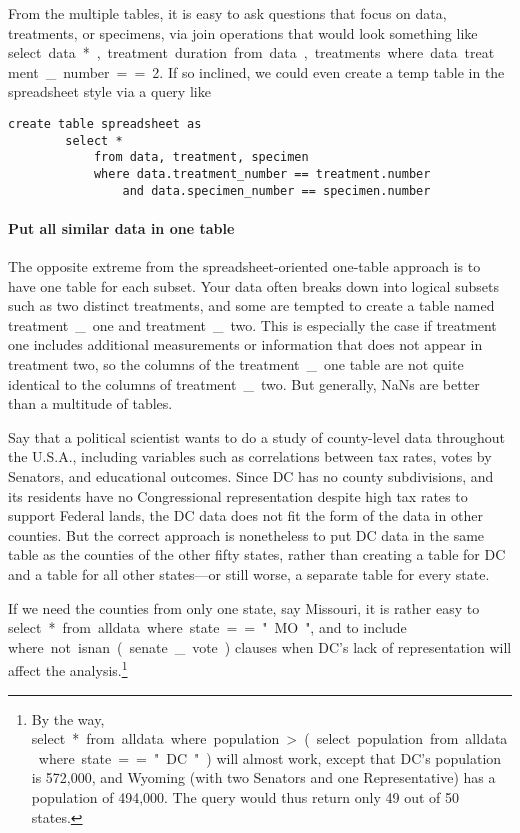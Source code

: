From the multiple tables, it is easy to ask questions that focus on
data, treatments, or specimens, via join operations that would look
something like \si{select data.*, treatment.duration from data, treatments
where data.treat\-ment\_number==2}. If so inclined, we could even create
a temp table in the spreadsheet style via a query like 
\begin{lstlisting}
create table spreadsheet as 
        select * 
            from data, treatment, specimen 
            where data.treatment_number == treatment.number 
                and data.specimen_number == specimen.number
\end{lstlisting}

\paragraph{Put all similar data in one table} The opposite extreme from
the spread\-sheet-oriented one-table approach is to have one table for
each subset. Your data often breaks
down into logical subsets such as two distinct treatments, and 
some are tempted to create a table named \si{treatment\_one} and 
\si{treatment\_two}. This is especially the case if treatment one
includes additional measurements or information that does not appear in
treatment two, so the columns of the \si{treatment\_one} table are not
quite identical to the columns of \si{treatment\_two}. But generally,
\si{NaN}s are better than a multitude of tables.

Say that a political scientist wants to do
a study of county-level data throughout the U.S.A., including variables
such as correlations between tax rates, votes by Senators, and educational
outcomes. Since DC has no county subdivisions, and its residents have no
Congressional representation despite high tax rates to support
Federal lands, the DC data does not fit the form of the data in other
counties. But the correct approach is nonetheless to put DC data in
the same table as the counties of the other fifty states, rather than
creating a table for DC and a table for all other states---or still worse,
a separate table for every state. 

If we need the counties from only one state, say Missouri, it is
rather easy to \si{select * from alldata where state=="MO"}, and to
include \si{where not isnan(senate\_vote)} clauses when DC's lack of
representation will affect the analysis.\footnote{By the way, \si{select
* from alldata where population > (select population from alldata where
state == "DC")} will almost work, except that DC's
population is 572,000, and Wyoming (with two Senators and one
Representative) has a population of 494,000. The query would thus return
only 49 out of 50 states.}

